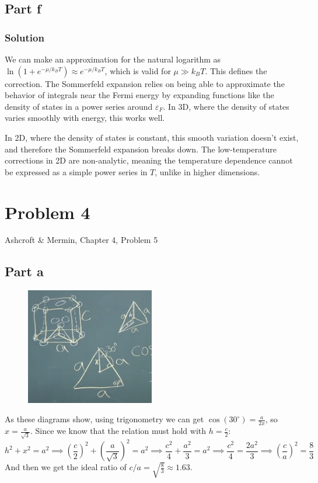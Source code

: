 \documentclass[12pt]{article}
\begin{document}
\subsection{Part f}
\subsubsection{Solution}
We can make an approximation for the natural logarithm as $\ln(1+e^{-\mu/k_BT}) \approx e^{-\mu/k_BT}$, which is valid for $\mu \gg k_BT$. This defines the correction.
The Sommerfeld expansion relies on being able to approximate the behavior of integrals near the Fermi energy by expanding functions like the density of states in a power series around \(\varepsilon_F\). In 3D, where the density of states varies smoothly with energy, this works well.

In 2D, where the density of states is constant, this smooth variation doesn't exist, and therefore the Sommerfeld expansion breaks down. The low-temperature corrections in 2D are non-analytic, meaning the temperature dependence cannot be expressed as a simple power series in \(T\), unlike in higher dimensions.
\section{Problem 4}
Ashcroft \& Mermin, Chapter 4, Problem 5
\subsection{Part a}
\begin{figure}[h]
    \centering
    \includegraphics[width=0.5\textwidth]{hcp.png}
\end{figure}
As these diagrams show, using trigonometry we can get $\cos(30^\circ) = \frac{a}{2x}$, so $x = \frac{a}{\sqrt{3}}$. Since we know that the relation must hold with $h=\frac{c}{2}$:
\begin{equation}
    h^2+x^2 = a^2 \implies \left(\frac{c}{2}\right)^2 + \left(\frac{a}{\sqrt{3}}\right)^2 = a^2 \implies \frac{c^2}{4} + \frac{a^2}{3} = a^2 \implies \frac{c^2}{4} = \frac{2a^2}{3} \implies \left(\frac{c}{a}\right)^2 = \frac{8}{3} 
\end{equation}
And then we get the ideal ratio of $c/a = \sqrt{\frac{8}{3}} \approx 1.63$.
\end{document}
